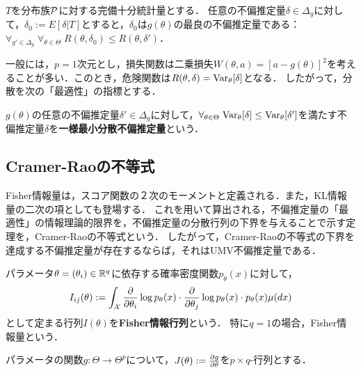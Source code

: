 \documentclass[uplatex,dvipdfmx]{jsreport}
\begin{document}
\begin{theorem}
    $T$を分布族$\P$に対する完備十分統計量とする．
    任意の不偏推定量$\delta\in\Delta_g$に対して，$\delta_0:=E[\delta|T]$とすると，$\delta_0$は$g(\theta)$の最良の不偏推定量である：$\forall_{g'\in\Delta_g}\;\forall_{\theta\in\Theta}\;R(\theta,\delta_0)\le R(\theta,\delta')$．
\end{theorem}
\begin{remarks}
    一般には，$p=1$次元とし，損失関数は二乗損失$W(\theta,a)=[a-g(\theta)]^2$を考えることが多い．このとき，危険関数は$R(\theta,\delta)=\Var_\theta[\delta]$となる．
    したがって，分散を次の「最適性」の指標とする．
\end{remarks}

\begin{definition}
    $g(\theta)$の任意の不偏推定量$\delta'\in\Delta_g$に対して，$\forall_{\theta\in\Theta}\;\Var_\theta[\delta]\le\Var_\theta[\delta']$を満たす不偏推定量$\delta$を\textbf{一様最小分散不偏推定量}という．
\end{definition}

\subsection{Cramer-Raoの不等式}

\begin{tcolorbox}[colframe=ForestGreen, colback=ForestGreen!10!white,breakable,colbacktitle=ForestGreen!40!white,coltitle=black,fonttitle=\bfseries\sffamily,
title=]
    Fisher情報量は，スコア関数の２次のモーメントと定義される．また，KL情報量の二次の項としても登場する．
    これを用いて算出される，不偏推定量の「最適性」の情報理論的限界を，不偏推定量の分散行列の下界を与えることで示す定理を，Cramer-Raoの不等式という．
    したがって，Cramer-Raoの不等式の下界を達成する不偏推定量が存在するならば，それはUMV不偏推定量である．
\end{tcolorbox}

\begin{definition}
    パラメータ$\theta=(\theta_i)\in\R^q$に依存する確率密度関数$p_\theta(x)$に対して，
    \[I_{ij}(\theta):=\int_\X\pp{}{\theta_i}\log p_\theta(x)\cdot\pp{}{\theta_j}\log p_\theta(x)\cdot p_\theta(x)\mu(dx)\]
    として定まる行列$I(\theta)$を\textbf{Fisher情報行列}という．
    特に$q=1$の場合，Fisher情報量という．
\end{definition}

\begin{notation}
    パラメータの関数$g:\Theta\to\Theta^p$について，$J(\theta):=\pp{g}{\theta}$を$p\times q$-行列とする．
\end{notation}
\end{document}
